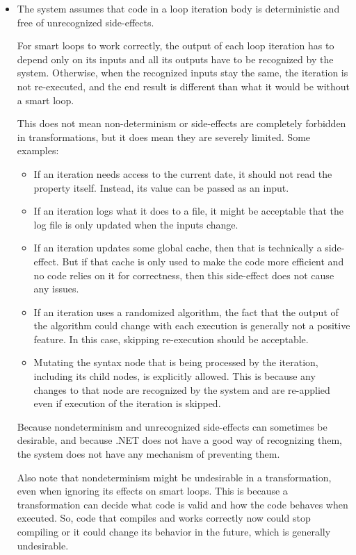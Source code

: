 \begin{itemize}
\item The system assumes that code in a loop iteration body is deterministic and free of unrecognized side-effects.

For smart loops to work correctly, the output of each loop iteration has to depend only on its inputs and all its outputs have to be recognized by the system. Otherwise, when the recognized inputs stay the same, the iteration is not re-executed, and the end result is different than what it would be without a smart loop.

This does not mean non-determinism or side-effects are completely forbidden in transformations, but it does mean they are severely limited. Some examples:

\begin{itemize}
\item If an iteration needs access to the current date, it should not read the  property itself. Instead, its value can be passed as an input.
\item If an iteration logs what it does to a file, it might be acceptable that the log file is only updated when the inputs change.
\item If an iteration updates some global cache, then that is technically a side-effect. But if that cache is only used to make the code more efficient and no code relies on it for correctness, then this side-effect does not cause any issues.
\item If an iteration uses a randomized algorithm, the fact that the output of the algorithm could change with each execution is generally not a positive feature. In this case, skipping re-execution should be acceptable.
\item Mutating the syntax node that is being processed by the iteration, including its child nodes, is explicitly allowed. This is because any changes to that node are recognized by the system and are re-applied even if execution of the iteration is skipped.
\end{itemize}

Because nondeterminism and unrecognized side-effects can sometimes be desirable, and because .NET does not have a good way of recognizing them, the system does not have any mechanism of preventing them.

Also note that nondeterminism might be undesirable in a transformation, even when ignoring its effects on smart loops. This is because a transformation can decide what code is valid and how the code behaves when executed. So, code that compiles and works correctly now could stop compiling or it could change its behavior in the future, which is generally undesirable.


\end{itemize}
